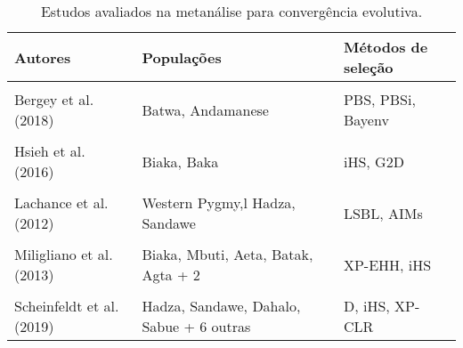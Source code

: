 \begin{table}[!htbp]

\small
\centering
\renewcommand{\arraystretch}{1.4}
\renewcommand\tabularxcolumn[1]{m{#1}}

\begin{tabularx}{\textwidth}{lXl}

\toprule
Autores & Populações & Métodos de seleção\\
\midrule
\cellcolor{gray!6}{Amorim et al. (2015)} & \cellcolor{gray!6}{Biaka, Mbuti, Surui, Karitiana} & \cellcolor{gray!6}{BayeScan}\\
Bergey et al. (2018) & Batwa, Andamanese & PBS, PBSi, Bayenv\\
\cellcolor{gray!6}{Harrison et al. (2019)} & \cellcolor{gray!6}{Batwa} & \cellcolor{gray!6}{PBS, iHS}\\
Hsieh et al. (2016) & Biaka, Baka & iHS, G2D\\
\cellcolor{gray!6}{Jarvis et al. (2012)} & \cellcolor{gray!6}{Bakola, Baka, Bedzan} & \cellcolor{gray!6}{LSBL, XP-EHH, iHS}\\
Lachance et al. (2012) & Western Pygmy,l Hadza, Sandawe & LSBL, AIMs\\
\cellcolor{gray!6}{López Herráez et al. (2009)} & \cellcolor{gray!6}{Pygmy, Surui, Karitiana} & \cellcolor{gray!6}{lnRsb}\\
Miligliano et al. (2013) & Biaka, Mbuti, Aeta, Batak, Agta + 2 & XP-EHH, iHS\\
\cellcolor{gray!6}{Perry et al. (2014)} & \cellcolor{gray!6}{Baka, Batwa} & \cellcolor{gray!6}{Fst, iHS, BayeScan}\\
Scheinfeldt et al. (2019) & Hadza, Sandawe, Dahalo, Sabue + 6 outras & D, iHS, XP-CLR\\
\bottomrule

\end{tabularx}

\caption{Estudos avaliados na metanálise para convergência evolutiva.}
\label{tab:metanalysis}

\vspace{2em}

\end{table}
